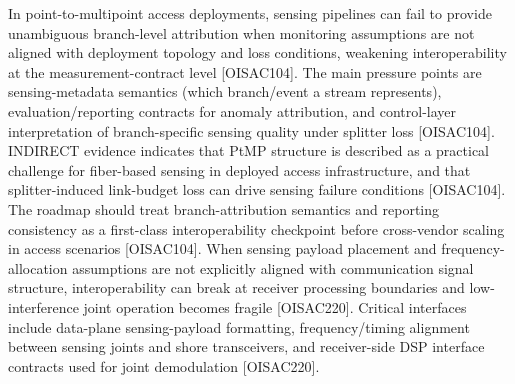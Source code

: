 {}
\markdownRendererSectionEnd \markdownRendererSectionBegin
{}\markdownRendererInterblockSeparator
{} In point-to-multipoint access deployments, sensing pipelines can fail to provide unambiguous branch-level attribution when monitoring assumptions are not aligned with deployment topology and loss conditions, weakening interoperability at the measurement-contract level [O\markdownRendererUnderscore{}ISAC\markdownRendererUnderscore{}104].\markdownRendererParagraphSeparator
{} The main pressure points are sensing-metadata semantics (which branch/event a stream represents), evaluation/reporting contracts for anomaly attribution, and control-layer interpretation of branch-specific sensing quality under splitter loss [O\markdownRendererUnderscore{}ISAC\markdownRendererUnderscore{}104].\markdownRendererParagraphSeparator
{} INDIRECT evidence indicates that PtMP structure is described as a practical challenge for fiber-based sensing in deployed access infrastructure, and that splitter-induced link-budget loss can drive sensing failure conditions [O\markdownRendererUnderscore{}ISAC\markdownRendererUnderscore{}104].\markdownRendererParagraphSeparator
{} The roadmap should treat branch-attribution semantics and reporting consistency as a first-class interoperability checkpoint before cross-vendor scaling in access scenarios [O\markdownRendererUnderscore{}ISAC\markdownRendererUnderscore{}104].\markdownRendererInterblockSeparator
{}
\markdownRendererSectionEnd \markdownRendererSectionBegin
{}\markdownRendererInterblockSeparator
{} When sensing payload placement and frequency-allocation assumptions are not explicitly aligned with communication signal structure, interoperability can break at receiver processing boundaries and low-interference joint operation becomes fragile [O\markdownRendererUnderscore{}ISAC\markdownRendererUnderscore{}220].\markdownRendererParagraphSeparator
{} Critical interfaces include data-plane sensing-payload formatting, frequency/timing alignment between sensing joints and shore transceivers, and receiver-side DSP interface contracts used for joint demodulation [O\markdownRendererUnderscore{}ISAC\markdownRendererUnderscore{}220].\markdownRendererParagraphSeparator
